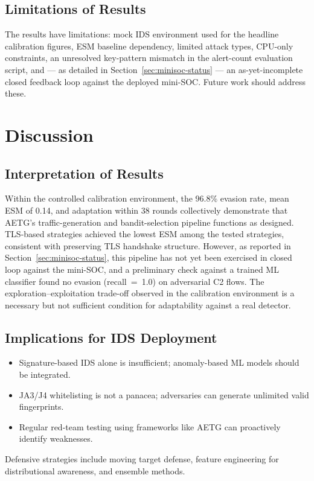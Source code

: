 \documentclass[review]{elsarticle}
\begin{document}
\subsection{Limitations of Results}
The results have limitations: mock IDS environment used for the headline calibration figures, ESM baseline dependency, limited attack types, CPU-only constraints, an unresolved key-pattern mismatch in the alert-count evaluation script, and --- as detailed in Section~\ref{sec:minisoc-status} --- an as-yet-incomplete closed feedback loop against the deployed mini-SOC. Future work should address these.

\section{Discussion}
\label{sec:discussion}

\subsection{Interpretation of Results}
Within the controlled calibration environment, the 96.8\% evasion rate, mean ESM of 0.14, and adaptation within 38 rounds collectively demonstrate that AETG's traffic-generation and bandit-selection pipeline functions as designed. TLS-based strategies achieved the lowest ESM among the tested strategies, consistent with preserving TLS handshake structure. However, as reported in Section~\ref{sec:minisoc-status}, this pipeline has not yet been exercised in closed loop against the mini-SOC, and a preliminary check against a trained ML classifier found no evasion (recall~=~1.0) on adversarial C2 flows. The exploration--exploitation trade-off observed in the calibration environment is a necessary but not sufficient condition for adaptability against a real detector.

\subsection{Implications for IDS Deployment}
\begin{itemize}
\item Signature-based IDS alone is insufficient; anomaly-based ML models should be integrated.
\item JA3/J4 whitelisting is not a panacea; adversaries can generate unlimited valid fingerprints.
\item Regular red-team testing using frameworks like AETG can proactively identify weaknesses.
\end{itemize}
Defensive strategies include moving target defense, feature engineering for distributional awareness, and ensemble methods.
\end{document}
